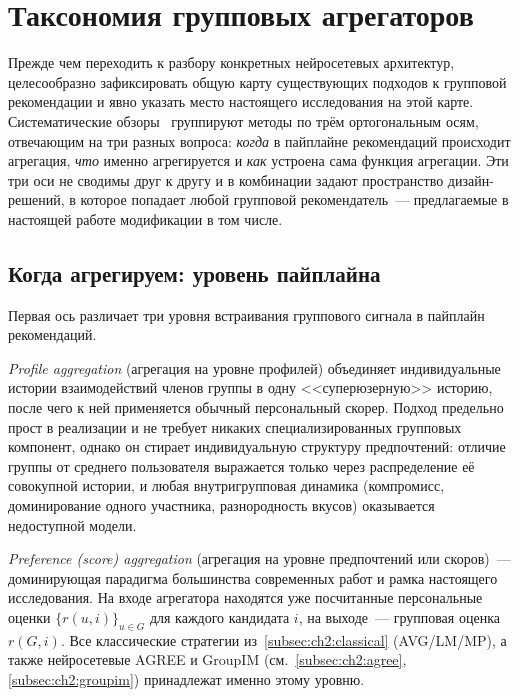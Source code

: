 \section{Таксономия групповых агрегаторов}
\label{sec:ch2:taxonomy}

Прежде чем переходить к разбору конкретных нейросетевых архитектур, целесообразно зафиксировать общую карту существующих подходов к групповой рекомендации и явно указать место настоящего исследования на этой карте. Систематические обзоры~\cite{dara2020survey, felfernig2018handbook} группируют методы по трём ортогональным осям, отвечающим на три разных вопроса: \emph{когда} в пайплайне рекомендаций происходит агрегация, \emph{что} именно агрегируется и \emph{как} устроена сама функция агрегации. Эти три оси не сводимы друг к другу и в комбинации задают пространство дизайн-решений, в которое попадает любой групповой рекомендатель~--- предлагаемые в настоящей работе модификации в том числе.

\subsection{Когда агрегируем: уровень пайплайна}
\label{subsec:ch2:tax-when}

Первая ось различает три уровня встраивания группового сигнала в пайплайн рекомендаций.

\emph{Profile aggregation} (агрегация на уровне профилей) объединяет индивидуальные истории взаимодействий членов группы в одну <<суперюзерную>> историю, после чего к ней применяется обычный персональный скорер. Подход предельно прост в реализации и не требует никаких специализированных групповых компонент, однако он стирает индивидуальную структуру предпочтений: отличие группы от среднего пользователя выражается только через распределение её совокупной истории, и любая внутригрупповая динамика (компромисс, доминирование одного участника, разнородность вкусов) оказывается недоступной модели.

\emph{Preference (score) aggregation} (агрегация на уровне предпочтений или скоров)~--- доминирующая парадигма большинства современных работ и рамка настоящего исследования. На входе агрегатора находятся уже посчитанные персональные оценки $\{r(u, i)\}_{u \in G}$ для каждого кандидата $i$, на выходе~--- групповая оценка $r(G, i)$. Все классические стратегии из~\ref{subsec:ch2:classical} (AVG/LM/MP), а также нейросетевые AGREE и GroupIM (см.~\ref{subsec:ch2:agree}, \ref{subsec:ch2:groupim}) принадлежат именно этому уровню.

